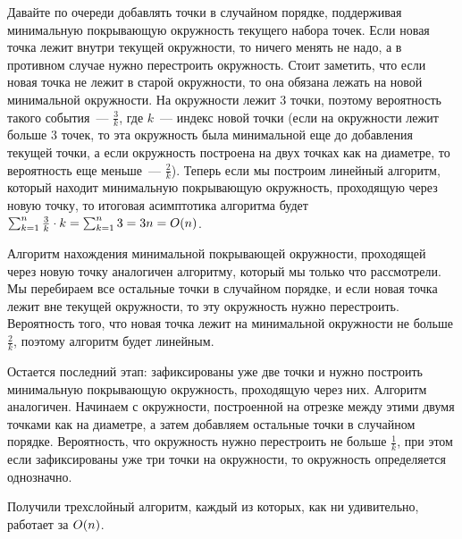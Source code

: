 Давайте по очереди добавлять точки в случайном порядке, поддерживая минимальную покрывающую окружность текущего набора точек. Если новая точка лежит внутри текущей окружности, то ничего менять не надо, а в противном случае нужно перестроить окружность. Стоит заметить, что если новая точка не лежит в старой окружности, то она обязана лежать на новой минимальной окружности. На окружности лежит $3$ точки, поэтому вероятность такого события~--- $\frac{3}{k}$, где $k$~--- индекс новой точки (если на окружности лежит больше $3$ точек, то эта окружность была минимальной еще до добавления текущей точки, а если окружность построена на двух точках как на диаметре, то вероятность еще меньше~--- $\frac{2}{k}$). Теперь если мы построим линейный алгоритм, который находит минимальную покрывающую окружность, проходящую через новую точку, то итоговая асимптотика алгоритма будет $\sum_{k = 1}^{n} \frac{3}{k} \cdot k = \sum_{k = 1}^{n} 3 = 3n = O(n)$.


Алгоритм нахождения минимальной покрывающей окружности, проходящей через новую точку аналогичен алгоритму, который мы только что рассмотрели. Мы перебираем все остальные точки в случайном порядке, и если новая точка лежит вне текущей окружности, то эту окружность нужно перестроить. Вероятность того, что новая точка лежит на минимальной окружности не больше $\frac{2}{k}$, поэтому алгоритм будет линейным.

Остается последний этап: зафиксированы уже две точки и нужно построить минимальную покрывающую окружность, проходящую через них. Алгоритм аналогичен. Начинаем с окружности, построенной на отрезке между этими двумя точками как на диаметре, а затем добавляем остальные точки в случайном порядке. Вероятность, что окружность нужно перестроить не больше $\frac{1}{k}$, при этом если зафиксированы уже три точки на окружности, то окружность определяется однозначно.

Получили трехслойный алгоритм, каждый из которых, как ни удивительно, работает за $O(n)$.
